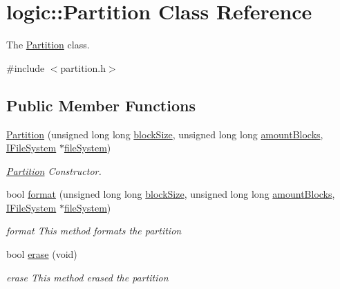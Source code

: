 \hypertarget{classlogic_1_1_partition}{}\section{logic\+:\+:Partition Class Reference}
\label{classlogic_1_1_partition}


The \mbox{\hyperlink{classlogic_1_1_partition}{Partition}} class.  




{\ttfamily \#include $<$partition.\+h$>$}

\subsection*{Public Member Functions}
\begin{DoxyCompactItemize}
\item 
\mbox{\hyperlink{classlogic_1_1_partition_ad4a50cfda17b7996c8b1480e8701cf3a}{Partition}} (unsigned long long \mbox{\hyperlink{classlogic_1_1_partition_ad3fb03e884170c6068b6724f1121ecc6}{block\+Size}}, unsigned long long \mbox{\hyperlink{classlogic_1_1_partition_a28f8b672dccb67a06036e223be813950}{amount\+Blocks}}, \mbox{\hyperlink{class_i_file_system}{I\+File\+System}} $\ast$\mbox{\hyperlink{classlogic_1_1_partition_a37dd86b3bc84bc1c7463beaf6d3adc57}{file\+System}})
\begin{DoxyCompactList}\small\item\em \mbox{\hyperlink{classlogic_1_1_partition}{Partition}} Constructor. \end{DoxyCompactList}\item 
bool \mbox{\hyperlink{classlogic_1_1_partition_a6530ca85e608e3af7243ac2b32e4c4e5}{format}} (unsigned long long \mbox{\hyperlink{classlogic_1_1_partition_ad3fb03e884170c6068b6724f1121ecc6}{block\+Size}}, unsigned long long \mbox{\hyperlink{classlogic_1_1_partition_a28f8b672dccb67a06036e223be813950}{amount\+Blocks}}, \mbox{\hyperlink{class_i_file_system}{I\+File\+System}} $\ast$\mbox{\hyperlink{classlogic_1_1_partition_a37dd86b3bc84bc1c7463beaf6d3adc57}{file\+System}})
\begin{DoxyCompactList}\small\item\em format This method formats the partition \end{DoxyCompactList}\item 
bool \mbox{\hyperlink{classlogic_1_1_partition_a43ea90c84d2d9b90e665efbc06d5d626}{erase}} (void)
\begin{DoxyCompactList}\small\item\em erase This method erased the partition \end{DoxyCompactList}\item 

\end{DoxyCompactItemize}
